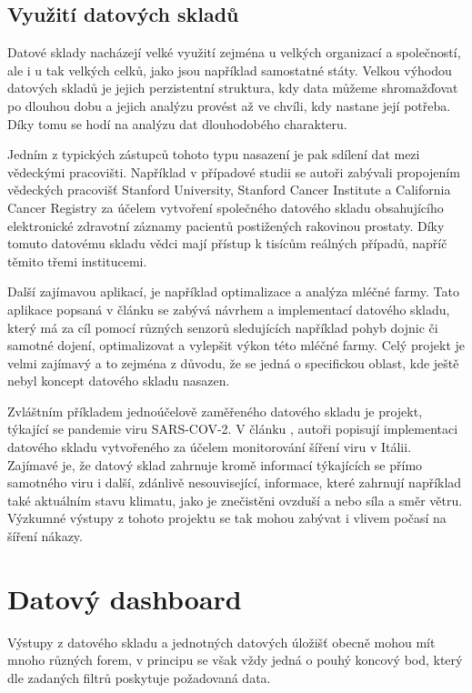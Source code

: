 \documentclass[
  digital,     %
  twoside,     %
  lof,         %
  lot,         %
]{fithesis4}
\begin{document}
\subsection{Využití datových skladů}
Datové sklady nacházejí velké využití zejména u velkých organizací a společností, ale i u tak velkých celků, jako jsou například samostatné státy. Velkou výhodou datových skladů je jejich perzistentní struktura, kdy data můžeme shromažďovat po dlouhou dobu a jejich analýzu provést až ve chvíli, kdy nastane její potřeba. Díky tomu se hodí na analýzu dat dlouhodobého charakteru.

Jedním z typických zástupců tohoto typu nasazení je pak sdílení dat mezi vědeckými pracovišti. Například v případové studii  \parencite{Seneviratne20180124} se autoři zabývali propojením vědeckých pracovišť Stanford University, Stanford Cancer Institute a California Cancer Registry za účelem vytvoření společného datového skladu obsahujícího elektronické zdravotní záznamy pacientů postižených rakovinou prostaty. Díky tomuto datovému skladu vědci mají přístup k tisícům reálných případů, napříč těmito třemi institucemi.

Další zajímavou aplikací, je například optimalizace a analýza mléčné farmy. Tato aplikace popsaná v článku  \parencite{Schuetz20180326} se zabývá návrhem a implementací datového skladu, který má za cíl pomocí různých senzorů sledujících například pohyb dojnic či samotné dojení, optimalizovat a vylepšit výkon této mléčné farmy. Celý projekt je velmi zajímavý a to zejména z důvodu, že se jedná o specifickou oblast, kde ještě nebyl koncept datového skladu nasazen.

Zvláštním příkladem jednoúčelově zaměřeného datového skladu je projekt, týkající se pandemie viru SARS-COV-2. V článku  \parencite{Agapito2020}, autoři popisují implementaci datového skladu vytvořeného za účelem monitorování šíření viru v Itálii. Zajímavé je, že datový sklad zahrnuje kromě informací týkajících se přímo samotného viru i další, zdánlivě nesouvisející, informace, které zahrnují například také aktuálním stavu klimatu, jako je znečistěni ovzduší a nebo síla a směr větru. Výzkumné výstupy z tohoto projektu se tak mohou zabývat i vlivem počasí na šíření nákazy. 

\section{Datový dashboard}
Výstupy z datového skladu a jednotných datových úložišť obecně mohou mít mnoho různých forem, v principu se však vždy jedná o pouhý koncový bod, který dle zadaných filtrů poskytuje požadovaná data.
\end{document}
